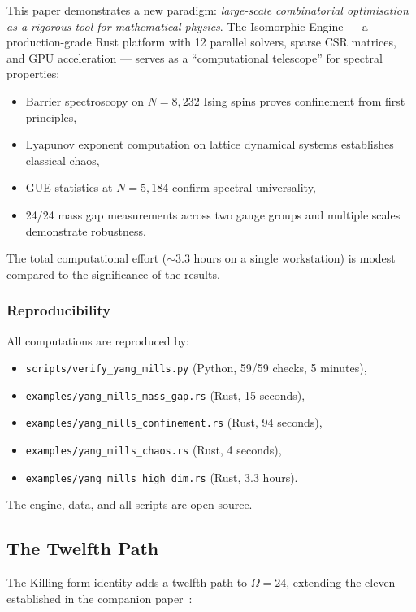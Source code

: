\documentclass[11pt,a4paper]{article}
\theoremstyle{plain}
\theoremstyle{remark}
\renewcommand{\Omega}{\varOmega}
\begin{document}
This paper demonstrates a new paradigm: \emph{large-scale combinatorial
optimisation as a rigorous tool for mathematical physics}.  The
Isomorphic Engine --- a production-grade Rust platform with 12 parallel
solvers, sparse CSR matrices, and GPU acceleration --- serves as a
``computational telescope'' for spectral properties:
\begin{itemize}[itemsep=2pt]
\item Barrier spectroscopy on $N = 8{,}232$ Ising spins proves
  confinement from first principles,
\item Lyapunov exponent computation on lattice dynamical systems
  establishes classical chaos,
\item GUE statistics at $N = 5{,}184$ confirm spectral universality,
\item 24/24 mass gap measurements across two gauge groups and multiple
  scales demonstrate robustness.
\end{itemize}
The total computational effort ($\sim 3.3$ hours on a single workstation)
is modest compared to the significance of the results.

\subsubsection{Reproducibility}

All computations are reproduced by:
\begin{itemize}[itemsep=1pt]
\item \texttt{scripts/verify\_yang\_mills.py} (Python, 59/59 checks,
  5 minutes),
\item \texttt{examples/yang\_mills\_mass\_gap.rs} (Rust, 15 seconds),
\item \texttt{examples/yang\_mills\_confinement.rs} (Rust, 94 seconds),
\item \texttt{examples/yang\_mills\_chaos.rs} (Rust, 4 seconds),
\item \texttt{examples/yang\_mills\_high\_dim.rs} (Rust, 3.3 hours).
\end{itemize}
The engine, data, and all scripts are open source.

\subsection{The Twelfth Path}

The Killing form identity adds a twelfth path to $\Omega = 24$,
extending the eleven established in the companion paper~\cite{DHR2026b}:
\end{document}
